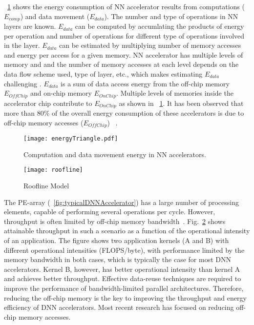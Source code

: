 \figurename{~\ref{fig:energyDistribution}} shows the energy consumption of NN accelerator results from computations ($E_{comp}$) and data movement ($E_{data}$). The number and type of operations in NN layers are known. $E_{data}$ can be computed by accumlating the products of energy per operation and number of operations for different type of operations involved in the layer. $E_{data}$ can be estimated by multiplying number of memory accesses and energy per access for a given memory. NN accelerator has multiple levels of memory and and the number of memory accesses at each level depends on the data flow scheme used, type of layer, etc., which makes estimating $E_{data}$ challenging . $E_{data}$ is a sum of data access energy from the off-chip memory $E_{OffChip}$ and on-chip memory $E_{OnChip}$. Multiple levels of memories inside the accelerator chip contribute to $E_{OnChip}$ as shown in \figurename{~\ref{fig:energyDistribution}}. It has been observed that more than 80\% of the overall energy consumption of these accelerators is due to off-chip memory accesses ($E_{OffChip}$) ~\cite{chen2014diannao}. 
\begin{figure}[!htb]
	\centering
	\captionsetup{font=sf}
	\texttt{[image: energyTriangle.pdf]}
	\caption{Computation and data movement energy in NN accelerators.}
	\label{fig:energyDistribution}
\end{figure}

\begin{figure}[!htb]
	\centering
	\captionsetup{font=sf}
	\texttt{[image: roofline]}
	\caption{Roofline Model}
	\label{fig:roofline}
\end{figure}

The PE-array (\figurename{~\ref{fig:typicalDNNAccelerator}}) has a large number of processing elements, capable of performing several operations per cycle. However, throughput is often limited by off-chip memory bandwidth~\cite{williams2009roofline}. Fig.~\ref{fig:roofline} shows attainable throughput in such a scenario as a function of the operational intensity of an application. The figure shows two application kernels (A and B) with different operational intensities (FLOPS/byte), with performance limited by the memory bandwidth in both cases, which is typically the case for most DNN accelerators. Kernel B, however, has better operational intensity than kernel A and achieves better throughput. Effective data-reuse techniques are required to improve the performance of bandwidth-limited parallel architectures. Therefore, reducing the off-chip memory is the key to improving the throughput and energy efficiency of DNN accelerators. Most recent research has focused on reducing off-chip memory accesses.
